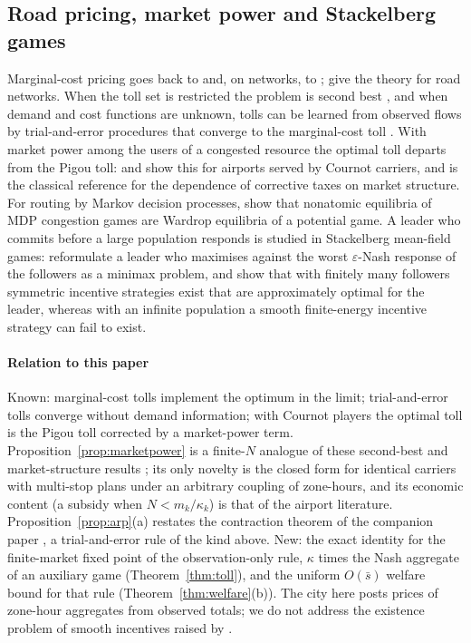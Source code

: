 \documentclass[preprint,11pt,authoryear]{elsarticle}
\theoremstyle{plain}
\theoremstyle{remark}
\begin{document}
\subsection{Road pricing, market power and Stackelberg games}\label{sec:rw-traffic}

Marginal-cost pricing goes back to \citet{Pigou1920} and, on networks, to \citet{Beckmann1956}; \citet{YangHuang2005} give the theory for road networks. When the toll set is restricted the problem is second best \citep{Verhoef2002}, and when demand and cost functions are unknown, tolls can be learned from observed flows by trial-and-error procedures that converge to the marginal-cost toll \citep{Yang2004}. With market power among the users of a congested resource the optimal toll departs from the Pigou toll: \citet{Brueckner2002} and \citet{PelsVerhoef2004} show this for airports served by Cournot carriers, and \citet{Buchanan1969} is the classical reference for the dependence of corrective taxes on market structure. For routing by Markov decision processes, \citet{CalderoneSastry2017} show that nonatomic equilibria of MDP congestion games are Wardrop equilibria of a potential game. A leader who commits before a large population responds is studied in Stackelberg mean-field games: \citet{GuoHuZhang2022} reformulate a leader who maximises against the worst $\varepsilon$-Nash response of the followers as a minimax problem, and \citet{Sanjari2022} show that with finitely many followers symmetric incentive strategies exist that are approximately optimal for the leader, whereas with an infinite population a smooth finite-energy incentive strategy can fail to exist.

\paragraph{Relation to this paper} Known: marginal-cost tolls implement the optimum in the limit; trial-and-error tolls converge without demand information; with Cournot players the optimal toll is the Pigou toll corrected by a market-power term. Proposition~\ref{prop:marketpower} is a finite-$N$ analogue of these second-best and market-structure results \citep{Buchanan1969,Brueckner2002,PelsVerhoef2004}; its only novelty is the closed form for identical carriers with multi-stop plans under an arbitrary coupling of zone-hours, and its economic content (a subsidy when $N<m_k/\kappa_k$) is that of the airport literature. Proposition~\ref{prop:arp}(a) restates the contraction theorem of the companion paper \citep{Omega2026}, a trial-and-error rule of the kind above. New: the exact identity for the finite-market fixed point of the observation-only rule, $\kappa$ times the Nash aggregate of an auxiliary game (Theorem~\ref{thm:toll}), and the uniform $O(\bar s)$ welfare bound for that rule (Theorem~\ref{thm:welfare}(b)). The city here posts prices of zone-hour aggregates from observed totals; we do not address the existence problem of smooth incentives raised by \citet{Sanjari2022}.
\end{document}
